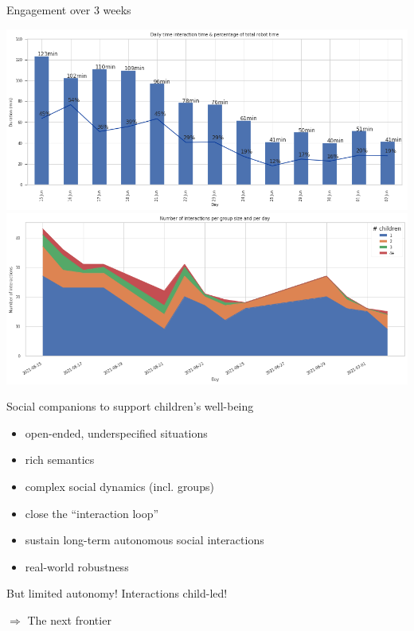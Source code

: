 \documentclass[xcolor=table]{beamer}
\begin{document}
\begin{frame}{Engagement over 3 weeks}
    \begin{center}
        \includegraphics[width=0.8\linewidth]{figs/robots4sen/fig4.png}
        \includegraphics[width=0.8\linewidth]{figs/robots4sen/fig1.2.png}
    \end{center}
\end{frame}


\begin{frame}{Social companions to support children's well-being}
\begingroup
{}
            \begin{block}{}

                \begin{itemize}
                    \item open-ended, underspecified situations
                    \item  rich semantics
                    \item  complex social dynamics (incl. groups)
                    \item  close the ``interaction loop''
                    \item  sustain long-term autonomous social interactions
                    \item  real-world robustness

                \end{itemize}
            \end{block}
\endgroup

\pause
    \begin{center}
        But limited autonomy! Interactions child-led!

        \pause

        $\Rightarrow$ The next frontier
    \end{center}
\end{frame}
\end{document}
